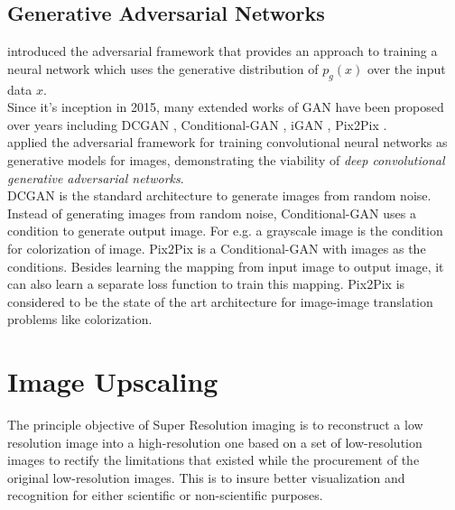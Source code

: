 \documentclass[12pt, letterpaper]{article}
\begin{document}
		\subsection{Generative Adversarial Networks}
		\hspace*{0.25 in}\cite{goodfellow2014generative} introduced the adversarial framework that provides an approach to training a neural network which uses the generative distribution of $p_g(x)$ over the input data $x$.\\
		\hspace*{0.25 in}Since it's inception in 2015, many extended works of GAN have been proposed over years including DCGAN \citep{radford2016unsupervised}, Conditional-GAN \citep{mirza2014conditional}, iGAN \citep{zhu2018generative}, Pix2Pix \citep{isola2018imagetoimage}.\\
		\hspace*{0.25 in}\cite{radford2016unsupervised} applied the adversarial framework for training convolutional neural networks as generative models for images, demonstrating the viability of \textit{deep convolutional generative adversarial networks}.\\
		\hspace*{0.25 in}DCGAN is the standard architecture to generate images from random noise. Instead of generating images from random noise, Conditional-GAN \citep{mirza2014conditional} uses a condition to generate output image. For e.g. a grayscale image is the condition for colorization of image. Pix2Pix \citep{isola2018imagetoimage} is a Conditional-GAN with images as the conditions. Besides learning the mapping from input image to output image, it can also learn a separate loss function to train this mapping. Pix2Pix is considered to be the state of the art architecture for image-image translation problems like colorization.

\section{Image Upscaling}
		\hspace*{0.25 in}  The principle objective of Super Resolution imaging is to reconstruct a low resolution image into a high-resolution one based on a set of low-resolution images to rectify the limitations that existed while the procurement of the original low-resolution images. This is to insure better visualization and recognition for either scientific or non-scientific purposes.
\end{document}
